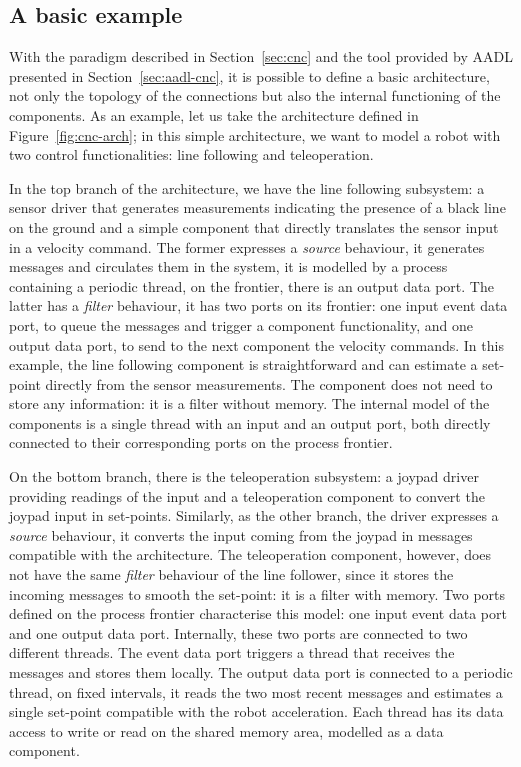 \subsection{A basic example}
\label{sec:cnc-basic}
With the paradigm described in Section~\ref{sec:cnc} and the tool provided by AADL presented in Section~\ref{sec:aadl-cnc}, it is possible to define a basic architecture, not only the topology of the connections but also the internal functioning of the components. As an example, let us take the architecture defined in Figure~\ref{fig:cnc-arch}; in this simple architecture, we want to model a robot with two control functionalities: line following and teleoperation.

In the top branch of the architecture, we have the line following subsystem: a sensor driver that generates measurements indicating the presence of a black line on the ground and a simple component that directly translates the sensor input in a velocity command. The former expresses a \textit{source} behaviour, it generates messages and circulates them in the system, it is modelled by a process containing a periodic thread, on the frontier, there is an output data port. The latter has a \textit{filter} behaviour, it has two ports on its frontier: one input event data port, to queue the messages and trigger a component functionality, and one output data port, to send to the next component the velocity commands. In this example, the line following component is straightforward and can estimate a set-point directly from the sensor measurements. The component does not need to store any information: it is a filter without memory. The internal model of the components is a single thread with an input and an output port, both directly connected to their corresponding ports on the process frontier.

On the bottom branch, there is the teleoperation subsystem: a joypad driver providing readings of the input and a teleoperation component to convert the joypad input in set-points. Similarly, as the other branch, the driver expresses a \textit{source} behaviour, it converts the input coming from the joypad in messages compatible with the architecture. The teleoperation component, however, does not have the same \textit{filter} behaviour of the line follower, since it stores the incoming messages to smooth the set-point: it is a filter with memory. Two ports defined on the process frontier characterise this model: one input event data port and one output data port. Internally, these two ports are connected to two different threads. The event data port triggers a thread that receives the messages and stores them locally. The output data port is connected to a periodic thread, on fixed intervals, it reads the two most recent messages and estimates a single set-point compatible with the robot acceleration. Each thread has its data access to write or read on the shared memory area, modelled as a data component.

